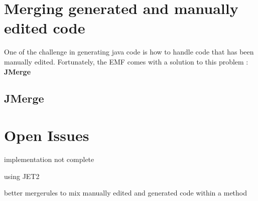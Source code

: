 \section{Merging generated and manually edited code}
One of the challenge in generating java code is how to handle code that has been manually edited. Fortunately, the EMF comes with a solution to this problem : \textbf{JMerge}\cite{JMERGEFAQ}

\subsection{JMerge}
\section{Open Issues}
implementation not complete


using JET2


better mergerules to mix manually edited and generated code within a method



